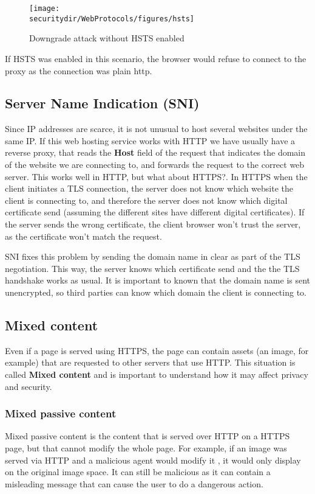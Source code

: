 \begin{figure}[htb]
	\begin{centering}
		\texttt{[image: \\securitydir/WebProtocols/figures/hsts]}
		\par
	\end{centering}
	\caption{\label{fig:hsts} Downgrade attack without HSTS enabled}
\end{figure}

If HSTS was enabled in this scenario, the browser would refuse to connect to the proxy as the connection was plain http. 


\subsection{Server Name Indication (SNI)}
Since IP addresses are scarce, it is not unusual to host several websites under the same IP. If this  web hosting service works with HTTP we have usually have a reverse proxy, that reads the \textbf{Host} field of the request that indicates the domain of the website we are connecting to, and forwards the request to the correct web server. This works well in HTTP, but what about HTTPS?. In HTTPS when the client initiates a TLS connection, the server does not know which website the client is connecting to, and therefore the server does not know which digital certificate send (assuming the different sites have different digital certificates). If the server sends the wrong certificate, the client browser won't trust the server, as the certificate won't match the request.

SNI fixes this problem by sending the domain name in clear as part of the TLS negotiation. This way, the server knows which certificate send and the the TLS handshake works as usual. It is important to known that the domain name is sent unencrypted, so third parties can know which domain the client is connecting to.

\subsection{Mixed content}
Even if a page is served using HTTPS, the page can contain assets (an image, for example) that are requested to other servers that use HTTP. This situation is called \textbf{Mixed content} and is important to understand how it may affect privacy and security. 

\subsubsection{Mixed passive content}
Mixed passive content is the content that is served over HTTP on a HTTPS page, but that cannot modify the whole page. For example, if an image was served via HTTP and a malicious agent would modify it , it would only display on the original image space. It can still be malicious as it can contain a misleading message that can cause the user to do a dangerous action.

